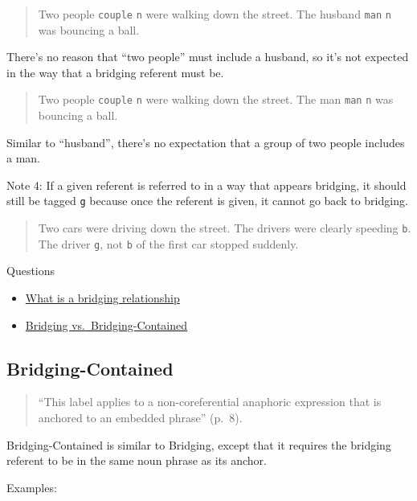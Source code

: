 \documentclass[
]{book}
\providecommand{\tightlist}{%
  \setlength{\itemsep}{0pt}\setlength{\parskip}{0pt}}
\begin{document}
\begin{quote}
Two people \texttt{couple} \texttt{n} were walking down the street.
The husband \texttt{man} \texttt{n} was bouncing a ball.
\end{quote}

There's no reason that ``two people'' must include a husband,
so it's not expected in the way that a bridging referent must be.

\begin{quote}
Two people \texttt{couple} \texttt{n} were walking down the street.
The man \texttt{man} \texttt{n} was bouncing a ball.
\end{quote}

Similar to ``husband'',
there's no expectation that a group of two people includes a man.

Note 4:
If a given referent is referred to in a way that appears
bridging, it should still be tagged \texttt{g}
because once the referent is given, it cannot go back to bridging.

\begin{quote}
Two cars were driving down the street.
The drivers were clearly speeding \texttt{b}.
The driver \texttt{g}, not \texttt{b} of the first car stopped suddenly.
\end{quote}

Questions

\begin{itemize}
\tightlist
\item
  \protect\hyperlink{bridging-relationships}{What is a bridging relationship}
\item
  \protect\hyperlink{bridging-vs.-bridging-contained}{Bridging vs.~Bridging-Contained}
\end{itemize}

\hypertarget{bridging-contained}{%
\subsection{Bridging-Contained}\label{bridging-contained}}

\begin{quote}
``This label applies to a non-coreferential anaphoric expression that is anchored to an embedded phrase'' (p.~8).
\end{quote}

Bridging-Contained is similar to Bridging, except that it requires the bridging referent to be in the same noun phrase as its anchor.

Examples:
\end{document}
